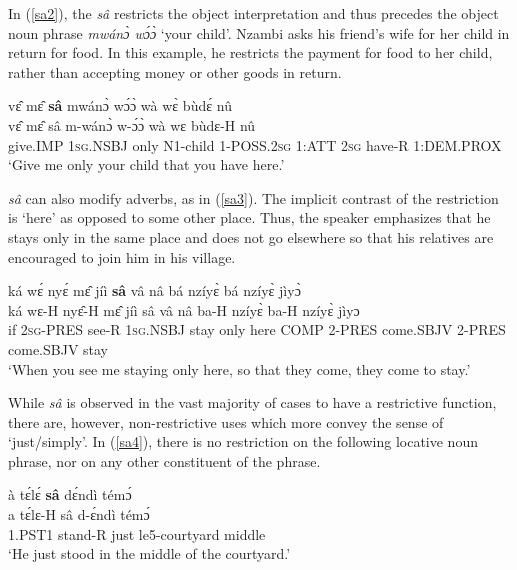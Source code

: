 In (\ref{sa2}), the {\itshape sâ} restricts the object interpretation and thus precedes the object noun phrase {\itshape mwánɔ̀ wɔ́ɔ̀} `your child'. Nzambi asks his friend's wife for her child in return for food. In this example, he restricts the payment for food to her child, rather than accepting money or other goods in return.

\begin{exe} 
\ex\label{sa2}
  \glll  vɛ̂ mɛ̂ {\bfseries sâ} mwánɔ̀ wɔ́ɔ̀ wà wɛ̀ bùdɛ́ nû \\
         vɛ̂ mɛ̂ sâ m-wánɔ̀ w-ɔ́ɔ̀ wà wɛ bùdɛ-H nû \\
          give.IMP 1\textsc{sg}.NSBJ only N1-child 1-POSS.2\textsc{sg} 1:ATT 2\textsc{sg} have-R 1:DEM.PROX \\
    \trans `Give me only your child that you have here.'
\end{exe}

{\itshape sâ} can also modify adverbs, as in (\ref{sa3}).  The implicit contrast of the restriction is `here' as opposed to some other place. Thus, the speaker emphasizes that he stays only in the same place and does not go elsewhere so that his relatives are encouraged to join him in his village.

\begin{exe} 
\ex\label{sa3}
  \glll  ká wɛ́ nyɛ́ mɛ̂ jíì {\bfseries sâ} vâ nâ bá nzíyɛ̀ bá nzíyɛ̀ jìyɔ̀ \\
       ká wɛ-H nyɛ̂-H mɛ̂ jíì sâ vâ nâ ba-H nzíyɛ̀ ba-H nzíyɛ̀ jìyɔ \\
         if 2\textsc{sg}-PRES see-R 1\textsc{sg}.NSBJ stay only here COMP 2-PRES come.SBJV 2-PRES come.SBJV stay   \\
    \trans `When you see me staying only here, so that they come, they come to stay.'
\end{exe}


While {\itshape sâ} is observed in the vast majority of cases to have a restrictive function, there are, however, non-restrictive uses which more convey the sense of `just/simply'. In (\ref{sa4}), there is no restriction on the following locative noun phrase, nor on any other constituent of the phrase.

\begin{exe} 
\ex\label{sa4} 
  \glll à tɛ́lɛ́ {\bfseries sâ} dɛ́ndì témɔ́ \\
         a tɛ́lɛ-H sâ d-ɛ́ndì témɔ́ \\
        1.PST1 stand-R just le5-courtyard middle \\
    \trans `He just stood in the middle of the courtyard.'
\end{exe}










